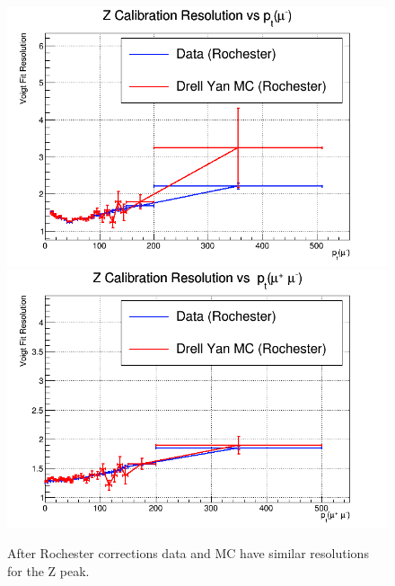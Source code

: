 \begin{figure}[hbp]
  \includegraphics[width=0.32\linewidth]{figures/muon_calib/zcal_roch_mc-data_res_pt_minus.png}
  \includegraphics[width=0.32\linewidth]{figures/muon_calib/zcal_roch_mc-data_res_dimu_pt.png}
  \caption
   {After Rochester corrections data and MC have similar resolutions for the Z peak.}
  \label{fig:data_mc_roch_res_after}
\end{figure}

